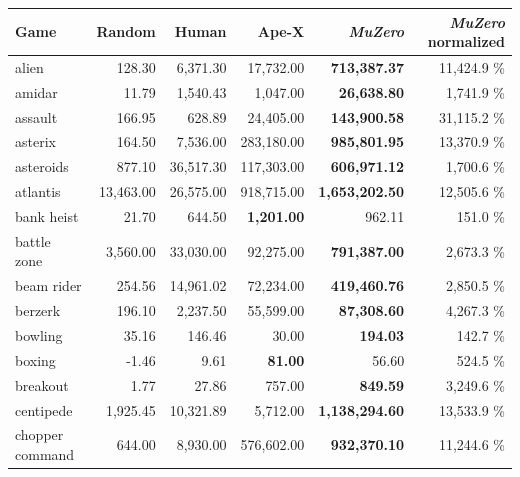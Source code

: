 \documentclass{article}
\newcommand{\muzero}{\emph{MuZero}}
\begin{document}
\begin{table}
\caption{
\label{tab:atari-results-at30}
\textbf{Evaluation of \muzero{} in Atari for individual games with 30 random no-op starts.} Best result for each game highlighted in \textbf{bold}. Each episode is limited to a maximum of 30 minutes of game time (108k frames). SimPLe was only evaluated on 36 of the 57 games, unavailable results are indicated with `-'. Human normalized score is calculated as $s_{normalized} = \frac{s_{agent} - s_{random}}{s_{human} - s_{random}}$.
}
\end{table}

\begin{table}
\scriptsize

\begin{center}\begin{tabularx}{0.750000\textwidth}{X| r r r r r}
\toprule
Game & Random & Human & Ape-X \cite{apex} & \muzero{} & \muzero{} normalized  \\
\midrule
alien &128.30 & 6,371.30 & 17,732.00 & \textbf{713,387.37} & 11,424.9 \%\\
amidar &11.79 & 1,540.43 & 1,047.00 & \textbf{26,638.80} & 1,741.9 \%\\
assault &166.95 & 628.89 & 24,405.00 & \textbf{143,900.58} & 31,115.2 \%\\
asterix &164.50 & 7,536.00 & 283,180.00 & \textbf{985,801.95} & 13,370.9 \%\\
asteroids &877.10 & 36,517.30 & 117,303.00 & \textbf{606,971.12} & 1,700.6 \%\\
atlantis &13,463.00 & 26,575.00 & 918,715.00 & \textbf{1,653,202.50} & 12,505.6 \%\\
bank heist &21.70 & 644.50 & \textbf{1,201.00} & 962.11 & 151.0 \%\\
battle zone &3,560.00 & 33,030.00 & 92,275.00 & \textbf{791,387.00} & 2,673.3 \%\\
beam rider &254.56 & 14,961.02 & 72,234.00 & \textbf{419,460.76} & 2,850.5 \%\\
berzerk &196.10 & 2,237.50 & 55,599.00 & \textbf{87,308.60} & 4,267.3 \%\\
bowling &35.16 & 146.46 & 30.00 & \textbf{194.03} & 142.7 \%\\
boxing &-1.46 & 9.61 & \textbf{81.00} & 56.60 & 524.5 \%\\
breakout &1.77 & 27.86 & 757.00 & \textbf{849.59} & 3,249.6 \%\\
centipede &1,925.45 & 10,321.89 & 5,712.00 & \textbf{1,138,294.60} & 13,533.9 \%\\
chopper command &644.00 & 8,930.00 & 576,602.00 & \textbf{932,370.10} & 11,244.6 \%\\

\end{tabularx}
\end{center}
\end{table}
\end{document}
